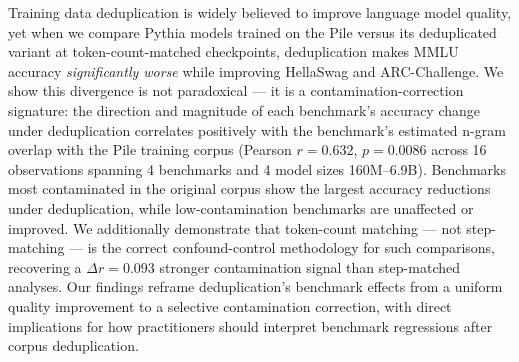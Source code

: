 Training data deduplication is widely believed to improve language model quality,
yet when we compare Pythia models trained on the Pile versus its deduplicated variant
at token-count-matched checkpoints, deduplication makes MMLU accuracy \textit{significantly
worse} while improving HellaSwag and ARC-Challenge. We show this divergence is not
paradoxical --- it is a contamination-correction signature: the direction and magnitude
of each benchmark's accuracy change under deduplication correlates positively with the
benchmark's estimated n-gram overlap with the Pile training corpus
(Pearson $r = 0.632$, $p = 0.0086$ across 16 observations spanning 4 benchmarks and
4 model sizes 160M--6.9B). Benchmarks most contaminated in the original corpus show
the largest accuracy reductions under deduplication, while low-contamination benchmarks
are unaffected or improved. We additionally demonstrate that token-count matching ---
not step-matching --- is the correct confound-control methodology for such comparisons,
recovering a $\Delta r = 0.093$ stronger contamination signal than step-matched analyses.
Our findings reframe deduplication's benchmark effects from a uniform quality improvement
to a selective contamination correction, with direct implications for how practitioners
should interpret benchmark regressions after corpus deduplication.
